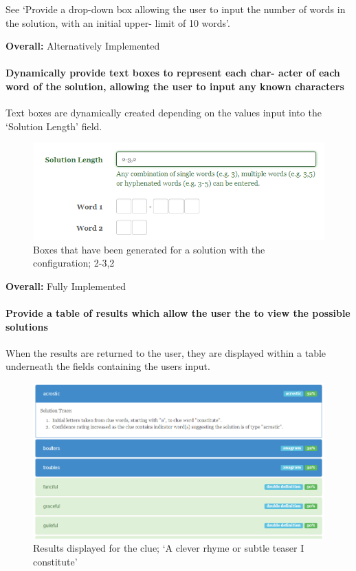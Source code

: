 See `Provide a drop-down box allowing the user to input the
number of words in the solution, with an initial upper-
limit of 10 words'.

{\bf Overall:} Alternatively Implemented

\paragraph{Dynamically provide text boxes to represent each char-
acter of each word of the solution, allowing the user to
input any known characters}

Text boxes are dynamically created depending on the values input into 
the `Solution Length' field. 

\begin{figure}[H]
	\centering
	\includegraphics[keepaspectratio=true,scale=0.9]{evidence/dynamicboxes.png}
	\caption{Boxes that have been generated for a solution with the configuration; 2-3,2}
\end{figure}

{\bf Overall:} Fully Implemented

\paragraph{Provide a table of results which allow the user the to
view the possible solutions}

When the results are returned to the user, they are displayed within a table 
underneath the fields containing the users input. 

\begin{figure}[H]
	\centering
	\includegraphics[keepaspectratio=true,scale=0.6]{evidence/listsolutions.png}
	\caption{Results displayed for the clue; `A clever rhyme or subtle teaser I constitute'}
\end{figure}


